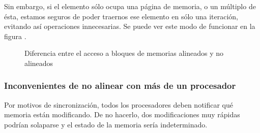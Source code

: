 Sin embargo, si el elemento sólo ocupa una página de memoria, o un múltiplo de ésta, estamos seguros de poder traernos 
ese elemento en sólo una iteración, evitando así operaciones innecesarias. Se puede ver este modo de funcionar en la 
figura  \cite{intelAlignment}.

\begin{figure}[hbtp]
\centering
{}
\hfill
{}
%
\caption{Diferencia entre el acceso a bloques de memorias alineados y no alineados}
\end{figure}
%

\subsubsection{Inconvenientes de no alinear con más de un procesador}
Por motivos de sincronización, todos los procesadores deben notificar qué memoria están modificando. De no hacerlo, dos 
modificaciones muy rápidas podrían solaparse y el estado de la memoria sería indeterminado.

